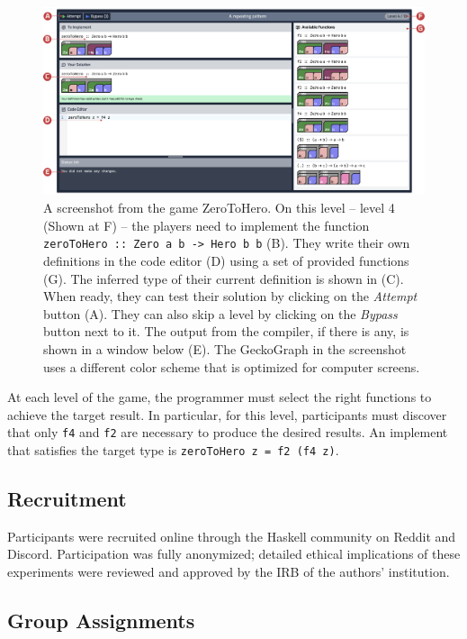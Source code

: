 \begin{figure}[hbt]
  \includegraphics[width=\linewidth]{figures/GamePlay}
  \caption[A screenshot from  the game ZeroToHero]{\label{fig:level-example} A screenshot from  the game ZeroToHero. On this level -- level 4 (Shown at F) -- the players need to implement the function \texttt{ zeroToHero :: Zero a b -> Hero b b} (B). They write their own definitions in the code editor (D) using a set of provided functions (G). The inferred type of their current definition is shown in (C). When ready, they can test their solution by clicking on the \textit{Attempt} button (A). They can also skip a level by clicking on the \textit{Bypass} button next to it. The output from the compiler, if there is any, is shown in a window below (E). The GeckoGraph in the screenshot uses a different color scheme that is optimized for computer screens.}
\end{figure}

At each level of the game, the programmer must select the right functions to achieve the target result. In particular, for this level, participants must discover that only \texttt{f4} and \texttt{f2} are necessary to produce the desired results. An implement that satisfies the target type is \texttt{zeroToHero z = f2  (f4  z)}. 


\subsection{Recruitment}
Participants were recruited online through the Haskell community on Reddit and Discord. Participation was fully anonymized; detailed ethical implications of these experiments were reviewed and approved by the IRB of the authors' institution.

\subsection{Group Assignments}

